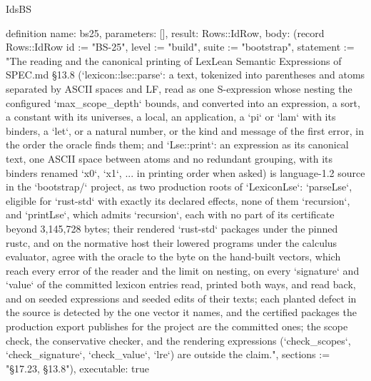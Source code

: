 \begin{lexlean}{IdsBS}
\begin{semanticmodule}
definition{
  name: bs25,
  parameters: [],
  result: Rows::IdRow,
  body: (record Rows::IdRow {id := "BS-25", level := "build", suite := "bootstrap", statement := "The reading and the canonical printing of LexLean Semantic Expressions of SPEC.md §13.8 (`lexicon::lse::parse`: a text, tokenized into parentheses and atoms separated by ASCII spaces and LF, read as one S-expression whose nesting the configured `max_scope_depth` bounds, and converted into an expression, a sort, a constant with its universes, a local, an application, a `pi` or `lam` with its binders, a `let`, or a natural number, or the kind and message of the first error, in the order the oracle finds them; and `Lse::print`: an expression as its canonical text, one ASCII space between atoms and no redundant grouping, with its binders renamed `x0`, `x1`, ... in printing order when asked) is language-1.2 source in the `bootstrap/` project, as two production roots of `LexiconLse`: `parseLse`, eligible for `rust-std` with exactly its declared effects, none of them `recursion`, and `printLse`, which admits `recursion`, each with no part of its certificate beyond 3,145,728 bytes; their rendered `rust-std` packages under the pinned rustc, and on the normative host their lowered programs under the calculus evaluator, agree with the oracle to the byte on the hand-built vectors, which reach every error of the reader and the limit on nesting, on every `signature` and `value` of the committed lexicon entries read, printed both ways, and read back, and on seeded expressions and seeded edits of their texts; each planted defect in the source is detected by the one vector it names, and the certified packages the production export publishes for the project are the committed ones; the scope check, the conservative checker, and the rendering expressions (`check_scopes`, `check_signature`, `check_value`, `lre`) are outside the claim.", sections := "§17.23, §13.8"}),
  executable: true
}


\end{semanticmodule}
\end{lexlean}
